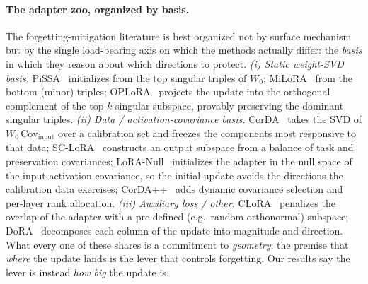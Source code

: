 \documentclass[11pt]{article}
\begin{document}
\paragraph{The adapter zoo, organized by basis.} The forgetting-mitigation
literature is best organized not by surface mechanism but by the single
load-bearing axis on which the methods actually differ: the \emph{basis} in which
they reason about which directions to protect.
\emph{(i) Static weight-SVD basis.} PiSSA~\citep{meng2024pissa} initializes from
the top singular triples of $W_0$; MiLoRA~\citep{wang2024milora} from the bottom
(minor) triples; OPLoRA~\citep{xiong2025oplora} projects the update into the
orthogonal complement of the top-$k$ singular subspace, provably preserving the
dominant singular triples. \emph{(ii) Data / activation-covariance basis.}
CorDA~\citep{yang2024corda} takes the SVD of $W_0\,\mathrm{Cov}_{\text{input}}$
over a calibration set and freezes the components most responsive to that data;
SC-LoRA~\citep{luo2025sclora} constructs an output subspace from a balance of task
and preservation covariances; LoRA-Null~\citep{tang2025loranull} initializes the
adapter in the null space of the input-activation covariance, so the initial
update avoids the directions the calibration data exercises;
CorDA++~\citep{yang2025cordapp} adds dynamic covariance selection and per-layer
rank allocation. \emph{(iii) Auxiliary loss /
other.} CLoRA~\citep{clora} penalizes the overlap of the adapter with a pre-defined
(e.g.\ random-orthonormal) subspace; DoRA~\citep{liu2024dora} decomposes each
column of the update into magnitude and direction. What every one of these shares
is a commitment to \emph{geometry}: the premise that \emph{where} the update lands
is the lever that controls forgetting. Our results say the lever is instead
\emph{how big} the update is.
\end{document}
